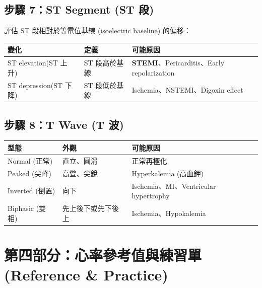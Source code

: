 \documentclass[12pt,a4paper]{article}
\begin{document}

\subsection{步驟 7：ST Segment (ST 段)}

評估 ST 段相對於等電位基線 (isoelectric baseline) 的偏移：

\begin{longtable}{p{4cm}p{5cm}p{4.5cm}}
\toprule
\textbf{變化} & \textbf{定義} & \textbf{可能原因} \\
\midrule
\endfirsthead
\bottomrule
\endfoot
ST elevation\newline (ST 上升) & ST 段高於基線 & \textcolor{emergency_red}{\textbf{STEMI}}、Pericarditis、\newline Early repolarization \\
\midrule
ST depression\newline (ST 下降) & ST 段低於基線 & Ischemia、NSTEMI、\newline Digoxin effect \\
\bottomrule
\end{longtable}

\subsection{步驟 8：T Wave (T 波)}

\begin{longtable}{p{3cm}p{5cm}p{5.5cm}}
\toprule
\textbf{型態} & \textbf{外觀} & \textbf{可能原因} \\
\midrule
\endfirsthead
\bottomrule
\endfoot
Normal (正常) & 直立、圓滑 & 正常再極化 \\
\midrule
Peaked (尖峰) & 高聳、尖銳 & \textcolor{emergency_red}{Hyperkalemia (高血鉀)} \\
\midrule
Inverted (倒置) & 向下 & Ischemia、MI、\newline Ventricular hypertrophy \\
\midrule
Biphasic (雙相) & 先上後下或先下後上 & Ischemia、Hypokalemia \\
\bottomrule
\end{longtable}

\newpage
\section{第四部分：心率參考值與練習單 (Reference \& Practice)}
\end{document}
